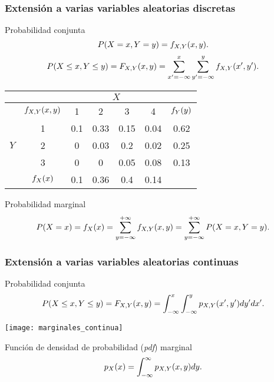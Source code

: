\documentclass[table]{beamer}
\begin{document}
\begin{frame}
    \frametitle{Extensión a varias variables aleatorias discretas}
    \begin{block}{Probabilidad conjunta}
        \begin{equation*}
            \prob{X = x, Y = y} = \pff{X, Y}{x, y} .
        \end{equation*}
        \begin{equation*}
            \prob{X \leq x, Y \leq y} = \pFF{X, Y}{x, y}
            = \sum_{x' = - \infty}^{x} \sum_{y' = - \infty}^{y} \pff{X, Y}{x', y'} .
        \end{equation*}
    \end{block}
    \begin{center}
        \small
        \begin{tabular}{c|c|cccc|c}
            & & \multicolumn{4}{c|}{$X$} & \\
            \hline
            & $\pff{X, Y}{x, y}$ & 1 & 2 & 3 & 4 & $\pff{Y}{y}$ \\
            \hline
            & 1 & 0.1 & 0.33 & 0.15 & 0.04 & 0.62 \\
            $Y$ & 2 & 0 & 0.03 & 0.2 & 0.02 & 0.25 \\
            & 3 & 0 & 0 & 0.05 & 0.08 & 0.13 \\
            \hline
            & $\pff{X}{x}$ & 0.1 & 0.36 & 0.4 & 0.14 &
        \end{tabular}
    \end{center}
    \begin{block}{Probabilidad marginal}
        \begin{equation*}
            \prob{X = x} = \pff{X}{x} = \sum_{y = - \infty}^{+ \infty} \pff{X, Y}{x, y}
            = \sum_{y = - \infty}^{+ \infty} \prob{X = x, Y = y} .
        \end{equation*}
    \end{block}
\end{frame}

\begin{frame}
    \frametitle{Extensión a varias variables aleatorias continuas}
    \begin{block}{Probabilidad conjunta}
        \begin{equation*}
            \prob{X \leq x, Y \leq y} = \pFF{X, Y}{x, y}
            = \int_{- \infty}^{x} \int_{- \infty}^{y} \ppdf{X, Y}{x', y'} d y' d x' .
        \end{equation*}
    \end{block}
    \begin{center}
        \texttt{[image: marginales\_continua]}
    \end{center}
    \begin{block}{Función de densidad de probabilidad (\emph{pdf}) marginal}
        \begin{equation*}
            \ppdf{X}{x} = \int_{- \infty}^{\infty} \ppdf{X, Y}{x, y} d y .
        \end{equation*}
    \end{block}
\end{frame}
\end{document}
